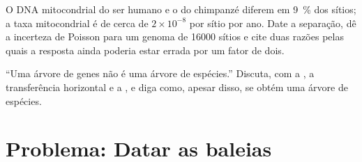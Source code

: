 \begin{exercise}[$\star\star\star$]\label{exo:b2:phylogenetic-trees:11}
O DNA mitocondrial do ser humano e o do chimpanzé diferem em \qty{9}{\%}
dos sítios; a taxa mitocondrial é de cerca de $2\times 10^{-8}$ por
sítio por ano. Date a separação, dê a incerteza de Poisson para um
genoma de \qty{16000}{} sítios e cite duas razões pelas quais a resposta
ainda poderia estar errada por um fator de dois.
\end{exercise}

\begin{exercise}[$\star\star\star$]\label{exo:b2:phylogenetic-trees:12}
``Uma árvore de genes não é uma árvore de espécies.'' Discuta, com a
, a transferência horizontal e a
, e diga como, apesar disso, se obtém uma árvore de
espécies.
\end{exercise}

\section{Problema: Datar as baleias}

